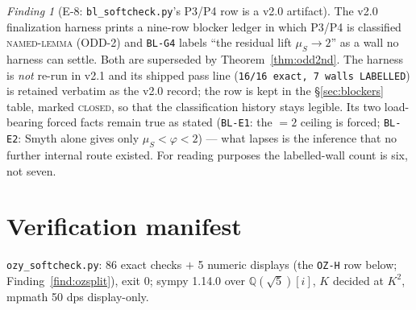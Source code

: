 \documentclass[11pt]{article}
\newcommand{\hx}[1]{\textcolor{cC}{\footnotesize\texttt{#1}}}
\newcommand{\Q}{\mathbb{Q}}
\newcommand{\gp}{\varphi}
\theoremstyle{plain}
\theoremstyle{definition}
\theoremstyle{remark}
\newtheorem{finding}[theorem]{Finding}
\begin{document}
\begin{finding}[E-8: \texttt{bl\_softcheck.py}'s P3/P4 row is a v2.0 artifact]\label{find:blstale}
The v2.0 finalization harness prints a nine-row blocker ledger in which P3/P4 is
classified \textsc{named-lemma} (ODD-2) and \hx{BL-G4} labels ``the residual
lift $\mu_S\to2$'' as a wall no harness can settle. Both are superseded by
Theorem~\ref{thm:odd2nd}. The harness is \emph{not} re-run in v2.1 and its
shipped pass line (\texttt{16/16 exact, 7 walls LABELLED}) is retained verbatim
as the v2.0 record; the row is kept in the \S\ref{sec:blockers} table, marked
\textsc{closed}, so that the classification history stays legible. Its two
load-bearing forced facts remain true as stated (\hx{BL-E1}: the $=2$ ceiling is
forced; \hx{BL-E2}: Smyth alone gives only $\mu_S<\gp<2$) --- what lapses is the
inference that no further internal route existed. For reading purposes the
labelled-wall count is six, not seven.
\end{finding}

\section{Verification manifest}\label{sec:verification}

\texttt{ozy\_softcheck.py}: 86 exact checks $+$ 5 numeric displays (the
\hx{OZ-H} row below; Finding~\ref{find:ozsplit}), exit 0; sympy 1.14.0 over
$\Q(\sqrt5)[i]$, $K$ decided at $K^2$, mpmath 50 dps display-only.
\end{document}
